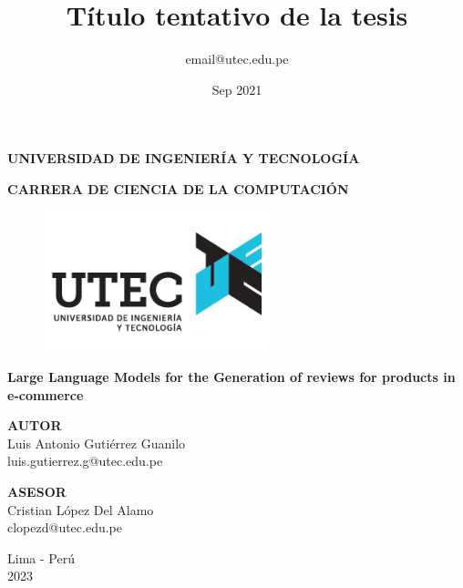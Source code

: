 \documentclass{report}
\title{Título tentativo de la tesis}
\author{email@utec.edu.pe}
\date{Sep 2021}
\begin{document}
\begin{titlepage}
    \begin{center}
        \Large
        \textbf{UNIVERSIDAD DE INGENIERÍA Y TECNOLOGÍA}
        \vspace*{0.9cm}

        \large
        \textbf{CARRERA DE CIENCIA DE LA COMPUTACIÓN}
        \vspace*{0.9cm}

        \begin{figure}[htbp]
            \centering
            \includegraphics[width=6.5cm,height=\textheight,keepaspectratio]{images/logo}
        \end{figure}

        \LARGE
        \textbf{Large Language Models for the Generation of reviews for products in e-commerce}

        \vspace{0.9cm}
        \Large


        \textbf{AUTOR}
        \vspace{0.5cm}
        \\Luis Antonio Guti\'errez Guanilo
        \\luis.gutierrez.g@utec.edu.pe
        \vfill

        \vspace{1.0cm}

        \textbf{ASESOR}
        \vspace{0.5cm}
        \\Cristian López Del Alamo
        \\clopezd@utec.edu.pe
        \vfill
        \vspace{0.8cm}
        \Large

        Lima - Perú
        \\
        2023

    \end{center}
\end{titlepage}
\end{document}
